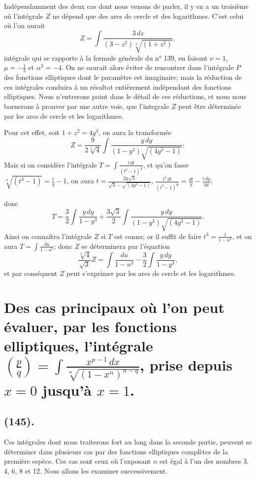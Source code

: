 \documentclass{article}
\begin{document}
Indépendamment des deux cas dont nous venons de parler, il y en a un troisième où l'intégrale $Z$ ne dépend que des arcs de cercle et des logarithmes. C'est celui où l'on aurait
\[ Z=\int\frac{3\,dz}{(3-z^{2})\sqrt[3]{(1+z^{2})}}, \]
intégrale qui se rapporte à la formule générale du n° 139, en faisant $\nu=1$, $\mu=-\frac{1}{3}$ et $\alpha^{3}=-4$. On ne saurait alors éviter de rencontrer dans l'intégrale $P$ des fonctions elliptiques dont le paramètre est imaginaire; mais la réduction de ces intégrales conduira à un résultat entièrement indépendant des fonctions elliptiques. Nous n'entrerons point dans le détail de ces réductions, et nous nous bornerons à prouver par une autre voie, que l'integrale $Z$ peut être déterminée par les arcs de cercle et les logarithmes.

Pour cet effet, soit $1+z^{2}=4y^{3}$, on aura la transformée
\[ Z=\frac{9}{2\sqrt[3]{4}}\int\frac{y\,dy}{(1-y^{3})\sqrt{(4y^{3}-1)}}: \]
Mais si on considère l'intégrale $T=\displaystyle\int\frac{t\,dt}{(t^{3}-1)^{\frac{2}{3}}}$, et qu'on fasse $\sqrt[3]{(t^{3}-1)}=\frac{t}{y}-1$, on aura $t=\frac{2y\sqrt{3}}{\sqrt{3}-\sqrt{(4y^{3}-1)}}$, $\frac{t^{2}\,dt}{(t^{3}-1)^{\frac{2}{3}}}=\frac{dt}{y}-\frac{t\,dy}{yy}$;

donc
\[ T=\frac{3}{2}\int\frac{y\,dy}{1-y^{3}}+\frac{3\sqrt{3}}{2}\int\frac{y\,dy}{(1-y^{3})\sqrt{(4y^{3}-1)}}. \]
Ainsi on connaîtra l'intégrale $Z$ si $T$ est connu; or il suffit de faire $t^{3}=\frac{1}{1-u^{3}}$, et on aura $T=\displaystyle\int\frac{du}{1-u^{3}}$; donc $Z$ se déterminera par l'équation
\[ \frac{\sqrt[3]{4}}{\sqrt{3}}Z=\int\frac{du}{1-u^{3}}-\frac{3}{2}\int\frac{y\,dy}{1-y^{3}}, \]
et par conséquent $Z$ peut s'exprimer par les arcs de cercle et les logarithmes.

\section*{Des cas principaux où l'on peut évaluer, par les fonctions elliptiques, l'intégrale $\left(\frac{p}{q}\right)=\displaystyle\int\frac{x^{p-1}\,dx}{\sqrt[n]{(1-x^{n})^{n-q}}}$, prise depuis $x=0$ jusqu'à $x=1$.}

\subsection*{(145).}

Ces intégrales dont nous traiterons fort au long dans la seconde partie, peuvent se déterminer dans plusieurs cas par des fonctions elliptiques complètes de la première espèce. Ces cas sont ceux où l'exposant $n$ est égal à l'un des nombres 3, 4, 6, 8 et 12. Nous allons les examiner successivement.
\end{document}
